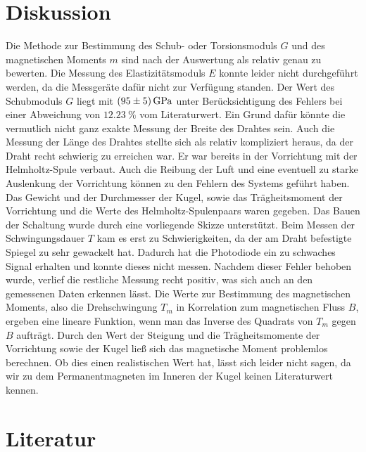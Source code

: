 \section{Diskussion}
Die Methode zur Bestimmung des Schub- oder Torsionsmoduls $G$ und des magnetischen Moments $m$ sind nach der Auswertung als relativ genau zu bewerten.
Die Messung des Elastizitätsmoduls $E$ konnte leider nicht durchgeführt werden, da die Messgeräte dafür nicht zur Verfügung standen. 
Der Wert des Schubmoduls $G$ liegt mit $\SI{95 \pm 5}{\giga\Pa}$ unter Berücksichtigung des Fehlers bei einer Abweichung von $\SI{12.23}{\percent}$ vom Literaturwert. Ein Grund dafür könnte die vermutlich nicht ganz exakte Messung der Breite des Drahtes sein. Auch die Messung der Länge des Drahtes stellte sich als relativ kompliziert heraus, da der Draht recht schwierig zu erreichen war. Er war bereits in der Vorrichtung mit der Helmholtz-Spule verbaut.
Auch die Reibung der Luft und eine eventuell zu starke Auslenkung der Vorrichtung können zu den Fehlern des Systems geführt haben. 
Das Gewicht und der Durchmesser der Kugel, sowie das Trägheitsmoment der Vorrichtung und die Werte des Helmholtz-Spulenpaars waren gegeben. 
Das Bauen der Schaltung wurde durch eine vorliegende Skizze unterstützt.
Beim Messen der Schwingungsdauer $T$ kam es erst zu Schwierigkeiten, da der am Draht befestigte Spiegel zu sehr gewackelt hat. Dadurch hat die Photodiode ein zu schwaches Signal erhalten und konnte dieses nicht messen. Nachdem dieser Fehler behoben wurde, verlief die restliche Messung recht positiv, was sich auch an den gemessenen Daten erkennen lässt. 
Die Werte zur Bestimmung des magnetischen Moments, also die Drehschwingung $T_{m}$ in Korrelation zum magnetischen Fluss $B$, ergeben eine lineare Funktion, wenn man das Inverse des Quadrats von $T_{m}$ gegen $B$ aufträgt. Durch den Wert der Steigung und die Trägheitsmomente der Vorrichtung sowie der Kugel ließ sich das magnetische Moment problemlos berechnen. Ob dies einen realistischen Wert hat, lässt sich leider nicht sagen, da wir zu dem Permanentmagneten im Inneren der Kugel keinen Literaturwert kennen.



\section{Literatur}


